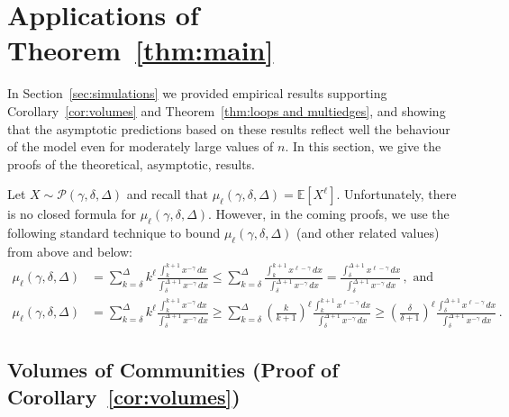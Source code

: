 \documentclass[12pt]{article}
\theoremstyle{definition}
\theoremstyle{remark}
\theoremstyle{remark}
\numberwithin{theorem}{section}
\newcommand{\E}[1]{{\mathbb E}\left[#1\right]}
\newcommand{\tpl}[3]{\ensuremath{\mathcal{P}\left(#1,#2,#3\right)}}
\newcommand{\moment}[2]{\ensuremath{\mu_{#1}(#2)}}
\begin{document}
\section{Applications of Theorem~\ref{thm:main}}\label{sec:loops and multiedges}

In Section~\ref{sec:simulations} we provided empirical results supporting Corollary~\ref{cor:volumes} and Theorem~\ref{thm:loops and multiedges}, and showing that the asymptotic predictions based on these results reflect well the behaviour of the model even for moderately large values of $n$. In this section, we give the proofs of the theoretical, asymptotic, results. 

Let $X \sim \tpl{\gamma}{\delta}{\Delta}$ and recall that $\moment{\ell}{\gamma,\delta,\Delta} = \E{X^\ell}$. Unfortunately, there is no closed formula for $\moment{\ell}{\gamma,\delta,\Delta}$. However, in the coming proofs, we use the following standard technique to bound $\moment{\ell}{\gamma,\delta,\Delta}$ (and other related values) from above and below: 
\begin{align*}
\moment{\ell}{\gamma,\delta,\Delta} &= \sum_{k = \delta}^\Delta k^\ell \frac{\int_k^{k+1} x^{-\gamma} \, dx}{\int_\delta^{\Delta+1} x^{-\gamma} \, dx}
\leq \sum_{k = \delta}^\Delta \frac{\int_k^{k+1} x^{\ell-\gamma} \, dx}{\int_\delta^{\Delta+1} x^{-\gamma} \, dx}
= \frac{\int_\delta^{\Delta+1} x^{\ell-\gamma} \, dx}{\int_\delta^{\Delta+1} x^{-\gamma} \, dx} \,, \text{ and}\\
\moment{\ell}{\gamma,\delta,\Delta} &= \sum_{k =\delta}^\Delta k^\ell \frac{\int_k^{k+1} x^{-\gamma} \, dx}{\int_\delta^{\Delta+1} x^{-\gamma} \, dx}
\geq \sum_{k = \delta}^\Delta \left(\frac{k}{k+1}\right)^\ell \frac{\int_k^{k+1} x^{\ell-\gamma} \, dx}{\int_\delta^{\Delta+1} x^{-\gamma} \, dx}
\geq \left(\frac{\delta}{\delta+1}\right)^\ell \frac{\int_\delta^{\Delta+1} x^{\ell-\gamma} \, dx}{\int_\delta^{\Delta+1} x^{-\gamma} \, dx} \,.
\end{align*}

\subsection{Volumes of Communities (Proof of Corollary~\ref{cor:volumes})}
\end{document}
